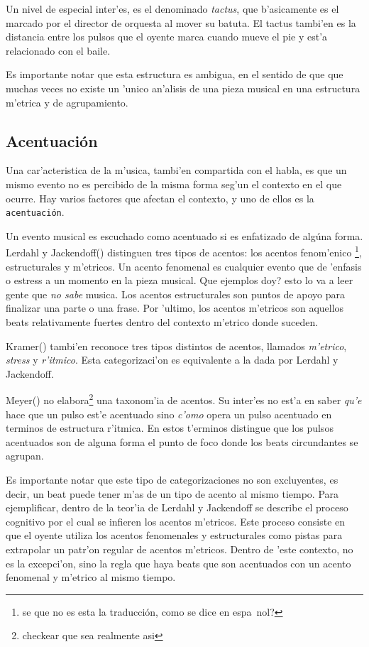 Un nivel de especial inter'es, es el denominado \emph{tactus}, que b'asicamente es el marcado por el director de orquesta al mover su batuta. 
El tactus tambi'en es la distancia entre los pulsos que el oyente marca cuando mueve el pie y est'a relacionado con el baile. 

Es importante notar que esta estructura es ambigua, en el sentido de que que muchas veces no existe un 'unico an'alisis de una pieza musical 
en una estructura m'etrica y de agrupamiento.


\subsection{Acentuaci\'on}
Una car'acteristica de la m'usica, tambi'en compartida con el habla, es que un mismo evento no es percibido de la misma forma seg'un
el contexto en el que ocurre. Hay varios factores que afectan el contexto, y uno de ellos es la \texttt{acentuaci\'on}. 

Un evento musical es escuchado como acentuado si es enfatizado de alg\'una forma. Lerdahl y Jackendoff(\cita) distinguen tres tipos de 
acentos: los acentos fenom'enico \footnote{\alert{se que no es esta la traducci\'on, como se dice en espa~nol?}}, estructurales y m'etricos.
Un acento fenomenal es cualquier evento que de 'enfasis o estress a un momento en la pieza musical. \alert{Que ejemplos doy? esto lo va a 
leer gente que \emph{no sabe} musica}. Los acentos estructurales son puntos de apoyo para finalizar una parte o una frase. 
Por 'ultimo, los acentos m'etricos son aquellos beats relativamente fuertes dentro del contexto m'etrico donde suceden.

Kramer(\cita) tambi'en reconoce tres tipos distintos de acentos, llamados \emph{m'etrico}, \emph{stress} y \emph{r'itmico}. Esta categorizaci'on
es equivalente a la dada por Lerdahl y Jackendoff.

Meyer(\cita) no elabora\footnote{checkear que sea realmente asi} una taxonom'ia de acentos. Su inter'es no est'a en saber \emph{qu'e} hace
que un pulso est'e acentuado sino \emph{c'omo} opera un pulso acentuado en terminos de estructura r'itmica. En estos t'erminos distingue
que los pulsos acentuados son de alguna forma el punto de foco donde los beats circundantes se agrupan. 

Es importante notar que este tipo de categorizaciones no son excluyentes, es decir, un beat puede tener m'as de un tipo de acento al mismo tiempo.
Para ejemplificar, dentro de la teor'ia de Lerdahl y Jackendoff se describe el proceso cognitivo por el cual se infieren los acentos m'etricos. Este
proceso consiste en que el oyente utiliza los acentos fenomenales y estructurales como pistas para extrapolar un patr'on regular de acentos m'etricos. 
Dentro de 'este contexto, no es la excepci'on, sino la regla que haya beats que son acentuados con un acento fenomenal y m'etrico al mismo tiempo.


